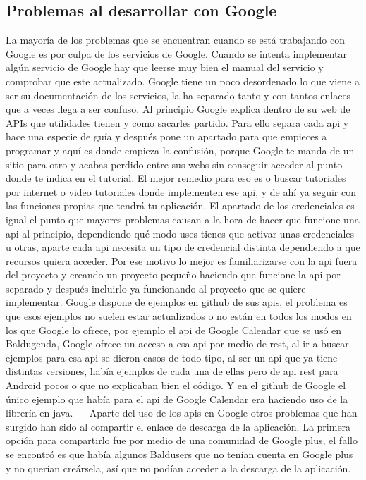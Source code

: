 \subsection{Problemas al desarrollar con Google}
\label{subsecc:Problemas al desarrollar con Google}

La mayoría de los problemas que se encuentran cuando se está trabajando con Google es por culpa de los servicios de Google.
Cuando se intenta implementar algún servicio de Google hay que leerse muy bien el manual del servicio y comprobar que este actualizado. Google tiene un poco desordenado lo que viene a ser su documentación de los servicios, la ha separado tanto y con tantos enlaces que a veces llega a ser confuso.
Al principio Google explica dentro de su web de APIs que utilidades tienen y como sacarles partido. Para ello separa cada api y hace una especie de guía y después pone un apartado para que empieces a programar y aquí es donde empieza la confusión, porque Google te manda de un sitio para otro y acabas perdido entre sus webs sin conseguir acceder al punto donde te indica en el tutorial.
El mejor remedio para eso es o buscar tutoriales por internet o video tutoriales donde implementen ese api, y de ahí ya seguir con las funciones propias que tendrá tu aplicación.
 El apartado de los credenciales es igual el punto que mayores problemas causan a la hora de hacer que funcione una api al principio, dependiendo qué modo uses tienes que activar unas credenciales u otras, aparte cada api necesita un tipo de credencial distinta dependiendo a que recursos quiera acceder.
Por ese motivo lo mejor es familiarizarse con la api fuera del proyecto y creando un proyecto pequeño haciendo que funcione la api por separado y después incluirlo ya funcionando al proyecto que se quiere implementar.
Google dispone de ejemplos en github de sus apis, el problema es que esos ejemplos no suelen estar actualizados o no están en todos los modos en los que Google lo ofrece, por ejemplo el api de Google Calendar que se usó en Baldugenda, Google ofrece un acceso a esa api por medio de rest, al ir a buscar ejemplos para esa api se dieron casos de todo tipo, al ser un api que ya tiene distintas versiones, había ejemplos de cada una de ellas pero  de api rest para Android pocos o que no explicaban bien el código. Y en el github de Google el único ejemplo que había para el api de Google Calendar era haciendo uso de la librería en java.
 
Aparte del uso de los apis en Google otros problemas que han surgido han sido al compartir el enlace de descarga de la aplicación.
La primera opción para compartirlo fue por medio de una comunidad de Google plus,  el fallo se encontró es que había algunos Baldusers que no tenían cuenta en Google plus y no querían creársela, así que no podían acceder a la descarga de la aplicación.

